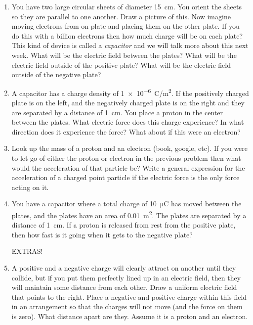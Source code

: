 \begin{enumerate}
\item
You have two large circular sheets of diameter \SI{15}{cm}. You orient the sheets so they are parallel to one another. Draw a picture of this. Now imagine moving electrons from on plate and placing them on the other plate. If you do this with a billion electrons then how much charge will be on each plate? This kind of device is called a \emph{capacitor} and we will talk more about this next week. What will be the electric field between the plates? What will be the electric field outside of the positive plate? What will be the electric field outside of the negative plate? \bigskip

\item
A capacitor has a charge density of \SI{1e-6}{\coulomb/m^2}. If the positively charged plate is on the left, and the negatively charged plate is on the right and they are separated by a distance of \SI{1}{cm}. You place a proton in the center between the plates. What electric force does this charge experience? In what direction does it experience the force? What about if this were an electron? 

\item
Look up the mass of a proton and an electron (book, google, etc). If you were to let go of either the proton or electron in the previous problem then what would the acceleration of that particle be? Write a general expression for the acceleration of a charged point particle if the electric force is the only force acting on it. 

\item
You have a capacitor where a total charge of \SI{10}{\micro\coulomb} has moved between the plates, and the plates have an area of \SI{0.01}{m^2}. The plates are separated by a distance of \SI{1}{cm}. If a proton is released from rest from the positive plate, then how fast is it going when it gets to the negative plate?

\newpage

EXTRAS!

\item
A positive and a negative charge will clearly attract on another until they collide, but if you put them perfectly lined up in an electric field, then they will maintain some distance from each other. Draw a uniform electric field that points to the right. Place a negative and positive charge within this field in an arrangement so that the charges will not move (and the force on them is zero). What distance apart are they. Assume it is a proton and an electron. 


\newpage 

\ %

\newpage

\end{enumerate}